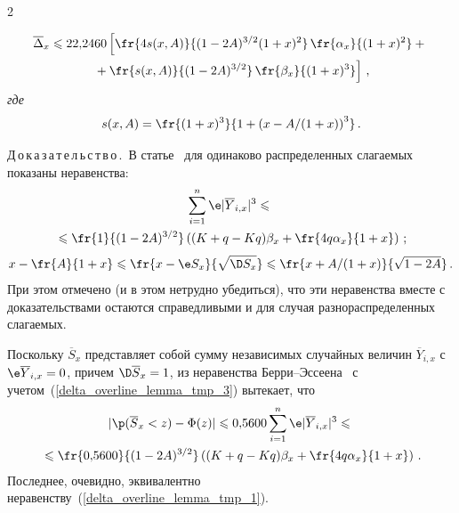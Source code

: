 \begin{multicols}{2}
\vspace*{-12pt}

\noindent
\begin{multline} 
\label{delta_overline_lemma_tmp_2}
\overline{\Delta}_x\leqslant 22{,}2460
\left[
 \fr{4  s(x,A)}{(1-2A)^{3/2} (1+x)^2}\,
 \fr{\alpha_x}{(1+x)^2}+{}\right.\\
\left. {}+\fr{s(x,A)}{(1-2A)^{3/2}}\, \fr{\beta_x}{(1+x)^3}
 \right]\,,
\end{multline}
\textit{где}
\begin{equation} 
\label{s(x,A)}
s(x,A)=\fr{(1+x)^3}{1+\left(x-{A}/(1+x)\right)^3}\,.
\end{equation}


\smallskip

\noindent
Д\,о\,к\,а\,з\,а\,т\,е\,л\,ь\,с\,т\,в\,о\,.\  В статье~\cite{KP2011_Neam} 
для одинаково распределенных слагаемых показаны неравенства:
\begin{multline} 
\label{delta_overline_lemma_tmp_3}
\sum\limits_{i=1}^n\e |\overline{Y}_{i,x}|^3 \leqslant {}\\
{}\leqslant
\fr{1}{(1-2A)^{3/2}}\left((K+q-Kq)\beta_x+\fr{4q\alpha_x}{1+x}\right)\,;
\end{multline}
\begin{equation} 
\label{delta_overline_lemma_tmp_5}
    x-\fr{A}{1+x}\leqslant
    \fr{x-\e S_x}{\sqrt{\D S_x}}\leqslant
    \fr{x+{A}/(1+x)}{\sqrt{1-2A}}\,.
\end{equation}
При этом отмечено (и в этом нетрудно убедиться), что эти
неравенства вместе с доказательствами остаются справедливыми и для
случая разнораспределенных слагаемых.

Поскольку $\overline{S}_x$ представляет собой сумму независимых
случайных величин $\overline{Y}_{i,x}$ с $\e
\overline{Y}_{i,x}=0$, причем $\D\overline{S}_{x}=1$, из
неравенства Бер\-ри--Эс\-се\-ена~\cite{Sh2010} с учетом~(\ref{delta_overline_lemma_tmp_3}) 
вытекает, что
\begin{multline*}
|\p(\overline{S}_x<z)-\Phi(z)|\leqslant
0{,}5600\sum\limits_{i=1}^n\e|\overline{Y}_{i,x}|^3\leqslant{}\\
{}\leqslant
\fr{0{,}5600}{(1-2A)^{3/2}}\left((K+q-Kq)\beta_x+\fr{4q\alpha_x}{1+x}\right)\,.
\end{multline*}
Последнее, очевидно, эквивалентно неравенству~(\ref{delta_overline_lemma_tmp_1}).


\end{multicols}
